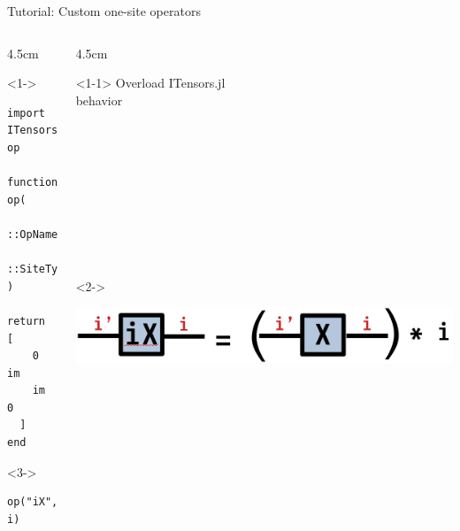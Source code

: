 \begin{frame}[fragile]{Tutorial: Custom one-site operators}

\begin{columns}

\begin{column}{4.5cm}

\begin{onlyenv}<1->

\begin{lstlisting}[language=JuliaLocal, style=julia, basicstyle=\small]
import ITensors: op

function op(
  ::OpName"iX",
  ::SiteType"S=1/2"
)
  return [
    0 im
    im 0
  ]
end
\end{lstlisting}

\end{onlyenv}

\begin{onlyenv}<3->

\begin{lstlisting}[language=JuliaLocal, style=julia, basicstyle=\small]
op("iX", i)
\end{lstlisting}

\end{onlyenv}

\end{column}

\begin{column}{4.5cm}

\begin{onlyenv}<1-1>
Overload ITensors.jl \\
behavior \\
~\\
~\\
~\\
~\\
~\\
~\\
~\\
~\\
~\\
\end{onlyenv}

\begin{onlyenv}<2->
\vspace*{0.0cm}
\begin{center}
\includegraphics[width=1.0\textwidth]{
  slides/assets/iX.png
} 
\end{center}
\vspace*{0.0cm}
\end{onlyenv}


\end{column}
\end{columns}
\end{frame}
